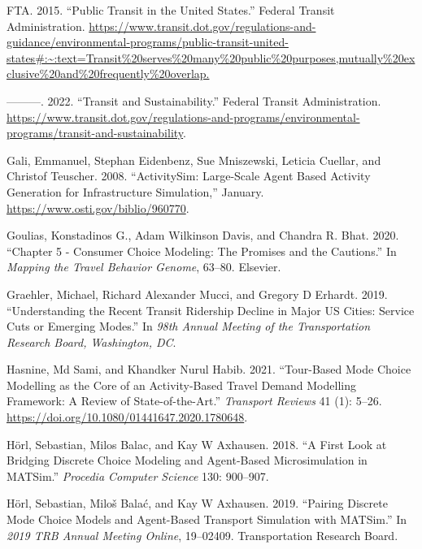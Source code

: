 \documentclass[12pt, oneside, openright]{byuthesis}
\newlength{\cslhangindent}
\newlength{\cslentryspacingunit} %
\newenvironment{CSLReferences}[2] %
 {%
  \setlength{\parindent}{0pt}
  \ifodd #1
  \let\oldpar\par
  \def\par{\hangindent=\cslhangindent\oldpar}
  \fi
  \setlength{\parskip}{#2\cslentryspacingunit}
 }%
 {}
\begin{document}
\begin{CSLReferences}{1}{0}
\leavevmode{}%
FTA. 2015. {``Public Transit in the United States.''} Federal Transit Administration. \url{https://www.transit.dot.gov/regulations-and-guidance/environmental-programs/public-transit-united-states\#:~:text=Transit\%20serves\%20many\%20public\%20purposes,mutually\%20exclusive\%20and\%20frequently\%20overlap.}

\leavevmode{}%
---------. 2022. {``Transit and Sustainability.''} Federal Transit Administration. \url{https://www.transit.dot.gov/regulations-and-programs/environmental-programs/transit-and-sustainability}.

\leavevmode{}%
Gali, Emmanuel, Stephan Eidenbenz, Sue Mniszewski, Leticia Cuellar, and Christof Teuscher. 2008. {``ActivitySim: Large-Scale Agent Based Activity Generation for Infrastructure Simulation,''} January. \url{https://www.osti.gov/biblio/960770}.

\leavevmode{}%
Goulias, Konstadinos G., Adam Wilkinson Davis, and Chandra R. Bhat. 2020. {``Chapter 5 - Consumer Choice Modeling: The Promises and the Cautions.''} In \emph{Mapping the Travel Behavior Genome}, 63--80. Elsevier.

\leavevmode{}%
Graehler, Michael, Richard Alexander Mucci, and Gregory D Erhardt. 2019. {``Understanding the Recent Transit Ridership Decline in Major US Cities: Service Cuts or Emerging Modes.''} In \emph{98th Annual Meeting of the Transportation Research Board, Washington, DC}.

\leavevmode{}%
Hasnine, Md Sami, and Khandker Nurul Habib. 2021. {``Tour-Based Mode Choice Modelling as the Core of an Activity-Based Travel Demand Modelling Framework: A Review of State-of-the-Art.''} \emph{Transport Reviews} 41 (1): 5--26. \url{https://doi.org/10.1080/01441647.2020.1780648}.

\leavevmode{}%
Hörl, Sebastian, Milos Balac, and Kay W Axhausen. 2018. {``A First Look at Bridging Discrete Choice Modeling and Agent-Based Microsimulation in MATSim.''} \emph{Procedia Computer Science} 130: 900--907.

\leavevmode{}%
Hörl, Sebastian, Miloš Balać, and Kay W Axhausen. 2019. {``Pairing Discrete Mode Choice Models and Agent-Based Transport Simulation with MATSim.''} In \emph{2019 TRB Annual Meeting Online}, 19--02409. Transportation Research Board.


\end{CSLReferences}
\end{document}
